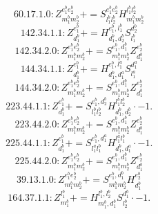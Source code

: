 \documentclass[letterpaper,10pt,fleqn,leqno,onecolumn]{article}
\begin{document}
\begin{equation} \;\;\;\;\;\;  60.17.1.0: Z^{e_{1}^{b}e_{2}^{b}}_{m_{1}^{b}m_{2}^{b}}+=S^{e_{1}^{b}e_{2}^{b}}_{l_{1}^{b}l_{2}^{b}}H^{l_{1}^{b}l_{2}^{b}}_{m_{1}^{b}m_{2}^{b}} \end{equation}
\begin{equation} \;\;\;\;\;\;  142.34.1.1: Z^{e_{1}^{b}}_{d_{1}^{b}}+=H^{e_{1}^{b},l_{1}^{b}}_{d_{1}^{b},d_{2}^{b}}S^{d_{2}^{b}}_{l_{1}^{b}} \end{equation}
\begin{equation} \;\;\;\;\;\;  142.34.2.0: Z^{e_{1}^{b}e_{2}^{b}}_{m_{1}^{b}m_{2}^{b}}+=S^{e_{1}^{b},d_{1}^{b}}_{m_{1}^{b}m_{2}^{b}}Z^{e_{2}^{b}}_{d_{1}^{b}} \end{equation}
\begin{equation} \;\;\;\;\;\;  144.34.1.1: Z^{e_{1}^{b}}_{d_{1}^{b}}+=H^{e_{1}^{b},l_{1}^{a}}_{d_{1}^{b},d_{1}^{a}}S^{d_{1}^{a}}_{l_{1}^{a}} \end{equation}
\begin{equation} \;\;\;\;\;\;  144.34.2.0: Z^{e_{1}^{b}e_{2}^{b}}_{m_{1}^{b}m_{2}^{b}}+=S^{e_{1}^{b},d_{1}^{b}}_{m_{1}^{b}m_{2}^{b}}Z^{e_{2}^{b}}_{d_{1}^{b}} \end{equation}
\begin{equation} \;\;\;\;\;\;  223.44.1.1: Z^{e_{1}^{b}}_{d_{1}^{b}}+=S^{e_{1}^{b},d_{2}^{b}}_{l_{1}^{b}l_{2}^{b}}H^{l_{1}^{b}l_{2}^{b}}_{d_{1}^{b},d_{2}^{b}}\cdot -1. \end{equation}
\begin{equation} \;\;\;\;\;\;  223.44.2.0: Z^{e_{1}^{b}e_{2}^{b}}_{m_{1}^{b}m_{2}^{b}}+=S^{e_{1}^{b},d_{1}^{b}}_{m_{1}^{b}m_{2}^{b}}Z^{e_{2}^{b}}_{d_{1}^{b}} \end{equation}
\begin{equation} \;\;\;\;\;\;  225.44.1.1: Z^{e_{1}^{b}}_{d_{1}^{b}}+=S^{e_{1}^{b},d_{1}^{a}}_{l_{1}^{a}l_{1}^{b}}H^{l_{1}^{a}l_{1}^{b}}_{d_{1}^{b},d_{1}^{a}}\cdot -1. \end{equation}
\begin{equation} \;\;\;\;\;\;  225.44.2.0: Z^{e_{1}^{b}e_{2}^{b}}_{m_{1}^{b}m_{2}^{b}}+=S^{e_{1}^{b},d_{1}^{b}}_{m_{1}^{b}m_{2}^{b}}Z^{e_{2}^{b}}_{d_{1}^{b}} \end{equation}
\begin{equation} \;\;\;\;\;\;  39.13.1.0: Z^{e_{1}^{b}e_{2}^{b}}_{m_{1}^{b}m_{2}^{b}}+=S^{e_{1}^{b},d_{1}^{b}}_{m_{1}^{b}m_{2}^{b}}H^{e_{2}^{b}}_{d_{1}^{b}} \end{equation}
\begin{equation} \;\;\;\;\;\;  164.37.1.1: Z^{l_{1}^{b}}_{m_{1}^{b}}+=H^{l_{1}^{b},l_{2}^{b}}_{m_{1}^{b},d_{1}^{b}}S^{d_{1}^{b}}_{l_{2}^{b}}\cdot -1. \end{equation}
\end{document}
